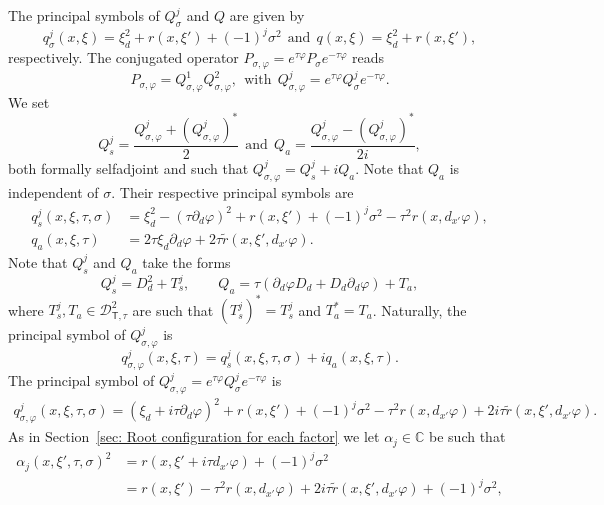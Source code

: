 \documentclass[10pt]{amsart}
\theoremstyle{plain}
\theoremstyle{definition}
\def\C{\mathbb{C}}
\newcommand{\Dsct}{\mathscr{D}_{{\scriptscriptstyle{\mathsf T}},\tau}}
\newcommand{\Psig}{P_{\sigma}}
\newcommand{\Qsig}{Q_{\sigma}}
\newcommand{\qsig}{q_{\sigma}}
\newcommand{\Pconj}{P_{\sigma,\varphi}}
\newcommand{\Qconj}{Q_{\sigma,\varphi}}
\newcommand{\qconj}{q_{\sigma,\varphi}}
\newcommand{\Qs}{Q_{s}}
\newcommand{\qs}{q_{s}}
\newcommand{\Qa}{Q_{a}}
\newcommand{\qa}{q_{a}}
\begin{document}
The principal symbols of $\Qsig^j$ and $Q$ are given by
\begin{equation}
\label{eq: symbols laplace operator}
\qsig^j (x,\xi)= \xi_d^2 + r(x,\xi') + (-1)^j \sigma^2
\ \ \text{and} \ \ q (x,\xi) = \xi_d^2 + r(x,\xi'),
\end{equation}
respectively.
The conjugated operator
$\Pconj=e^{\tau\varphi}\Psig e^{-\tau\varphi}$ reads
\begin{equation*}
\Pconj=\Qconj^1\Qconj^2,
\ \ \text{with}\ \
\Qconj^j=e^{\tau\varphi}\Qsig^je^{-\tau\varphi}.
\end{equation*}
We set
\begin{equation*}
\Qs^j=\frac{\Qconj^j+(\Qconj^j)^*}{2}
\ \ \text{and} \ \
\Qa=\frac{\Qconj^j-(\Qconj^j)^*}{2i},
\end{equation*}
both formally selfadjoint and such that
$\Qconj^j=\Qs^j+i\Qa$. Note that $\Qa$ is
independent of $\sigma$. Their respective
principal symbols
are
\begin{align*}
\qs^j(x,\xi,\tau,\sigma)&=\xi_d^2-(\tau\partial_d\varphi)^2+r(x,\xi')
+ (-1)^j\sigma^2-\tau^2r(x,d_{x'}\varphi),\\
\qa(x,\xi,\tau)&=2\tau\xi_d\partial_d\varphi+2\tau\tilde{r}(x,\xi',
d_{x'}\varphi).
\end{align*}
Note that $\Qs^j$ and $\Qa$ take the forms
\begin{equation}
\label{eq: form of Qs Qa}
\Qs^j = D_d^2 + T_s^j, \qquad
\Qa = \tau (\partial_d \varphi D_d
+ D_d \partial_d \varphi) + T_a,
\end{equation}
where $T_s^j, T_a \in \Dsct^2$ are such that $(T_s^j)^* = T_s^j$ and
$T_a^* = T_a$.
Naturally, the principal symbol of $\Qconj^j$ is
\begin{equation*}
\qconj^j(x,\xi,\tau)=\qs^j(x,\xi,\tau,\sigma)+i\qa(x,\xi,\tau).
\end{equation*}
The principal symbol of $\Qconj^j=e^{\tau\varphi}\Qsig^je^{-\tau\varphi}$ is
\begin{align*}
\qconj^j(x,\xi,\tau,\sigma)
=(\xi_d+i\tau\partial_d\varphi)^2+r(x,\xi')
+ (-1)^j\sigma^2-\tau^2r(x,d_{x'}\varphi)+2i\tau\tilde{r}(x,\xi',d_{x'}\varphi).
\end{align*}
As in Section~\ref{sec: Root configuration for each factor} we let $\alpha_j \in \C$ be such that
\begin{align*}
\alpha_j(x,\xi',\tau,\sigma)^2
&= r(x, \xi' + i \tau d_{x'}\varphi) + (-1)^j \sigma^2\\
&=r(x,\xi')
-\tau^2 r(x,d_{x'}\varphi)
+2i\tau\tilde{r}(x,\xi',d_{x'}\varphi)
+ (-1)^j \sigma^2,
\end{align*}
\end{document}

